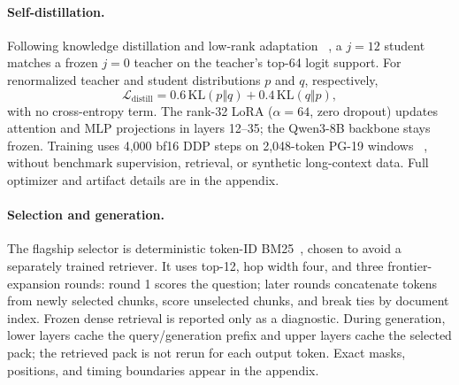 \paragraph{Self-distillation.}
Following knowledge distillation and low-rank adaptation
~\citep{distillation,lora}, a $j{=}12$ student matches a frozen $j{=}0$ teacher
on the teacher's top-64 logit support. For renormalized teacher and student
distributions $p$ and $q$, respectively,
\begin{equation}
\mathcal L_{\mathrm{distill}}
=0.6\,\mathrm{KL}(p\Vert q)+0.4\,\mathrm{KL}(q\Vert p),
\label{eq:distill}
\end{equation}
with no cross-entropy term. The rank-32 LoRA ($\alpha{=}64$, zero dropout)
updates attention and MLP projections in layers 12--35; the Qwen3-8B backbone
stays frozen. Training uses 4,000 bf16 DDP steps on 2,048-token PG-19 windows
~\citep{pg19}, without benchmark supervision, retrieval, or synthetic
long-context data. Full optimizer and artifact details are in the appendix.

\paragraph{Selection and generation.}
The flagship selector is deterministic token-ID BM25~\citep{bm25}, chosen to
avoid a separately trained retriever. It uses top-12, hop width four, and three
frontier-expansion rounds: round 1 scores the question; later rounds concatenate
tokens from newly selected chunks, score unselected chunks, and break ties by
document index. Frozen dense retrieval is reported only as a diagnostic. During
generation, lower layers cache the query/generation prefix and upper layers
cache the selected pack; the retrieved pack is not rerun for each output token.
Exact masks, positions, and timing boundaries appear in the appendix.
